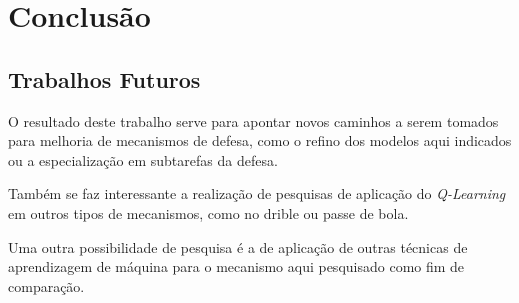 \chapter{Conclusão}\label{sec:conclusion}

\section{Trabalhos Futuros}\label{sec:future}

O resultado deste trabalho serve para apontar novos caminhos a serem tomados
para melhoria de mecanismos de defesa, como o refino dos modelos aqui indicados
ou a especialização em subtarefas da defesa. 

Também se faz interessante a realização de pesquisas de aplicação do
\textit{Q-Learning} em outros tipos de mecanismos, como no drible ou passe de
bola.

Uma outra possibilidade de pesquisa é a de aplicação de outras técnicas de
aprendizagem de máquina para o mecanismo aqui pesquisado como fim de comparação.